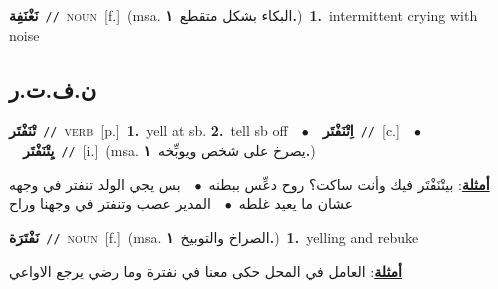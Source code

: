 \documentclass[10pt,a4paper,twoside]{article} %
\begin{document}
\begin{multicols}{2}
{\setlength\topsep{0pt}\textbf{\foreignlanguage{arabic}{نَغْنَفِة}}\ {\color{gray}\texttt{//}\color{black}}\ \textsc{noun}\ [f.]\ \color{gray}(msa. \foreignlanguage{arabic}{البكاء بشكل متقطع}~\foreignlanguage{arabic}{\textbf{١.}})\color{black}\ \textbf{1.}~intermittent crying with noise\ } \vspace{2mm}

\vspace{-3mm}
\subsection*{\color{blue}\foreignlanguage{arabic}{ن.ف.ت.ر}\color{blue}{}} 

{\setlength\topsep{0pt}\textbf{\foreignlanguage{arabic}{تْنَفْتَر}}\ {\color{gray}\texttt{//}\color{black}}\ \textsc{verb}\ [p.]\ \textbf{1.}~yell at sb.  \textbf{2.}~tell sb off\ \ $\bullet$\ \ \setlength\topsep{0pt}\textbf{\foreignlanguage{arabic}{اِتْنَفْتَر}}\ {\color{gray}\texttt{//}\color{black}}\ [c.]\ \ $\bullet$\ \ \setlength\topsep{0pt}\textbf{\foreignlanguage{arabic}{يِتْنَفْتَر}}\ {\color{gray}\texttt{//}\color{black}}\ [i.]\ \color{gray}(msa. \foreignlanguage{arabic}{يصرخ على شخص ويوبِّخه}~\foreignlanguage{arabic}{\textbf{١.}})\color{black}\  \begin{flushright}\color{gray}\foreignlanguage{arabic}{\textbf{\underline{\foreignlanguage{arabic}{أمثلة}}}: بيتْنَفْتَر فيك وأنت ساكت؟ روح دعِّس ببطنه\ $\bullet$\ \  بس يجي الولد تنفتر في وجهه عشان ما يعيد غلطه\ $\bullet$\ \  المدير عصب وتنفتر في وجهنا وراح}\end{flushright}\color{black}} \vspace{2mm}

{\setlength\topsep{0pt}\textbf{\foreignlanguage{arabic}{نَفْتَرَة}}\ {\color{gray}\texttt{//}\color{black}}\ \textsc{noun}\ [f.]\ \color{gray}(msa. \foreignlanguage{arabic}{الصراخ والتوبيخ}~\foreignlanguage{arabic}{\textbf{١.}})\color{black}\ \textbf{1.}~yelling and rebuke\  \begin{flushright}\color{gray}\foreignlanguage{arabic}{\textbf{\underline{\foreignlanguage{arabic}{أمثلة}}}: العامل في المحل حكى معنا في نفترة وما رضي يرجع الاواعي}\end{flushright}\color{black}} \vspace{2mm}


\end{multicols}
\end{document}

